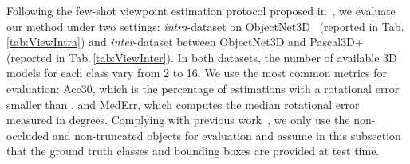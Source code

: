 \documentclass[runningheads]{llncs}
\begin{document}
Following the few-shot viewpoint estimation protocol proposed in~\cite{Tseng2019FewShotVE}, we evaluate our method under two settings: \emph{intra}-dataset on ObjectNet3D~\cite{objectnet3d16} (reported in Tab.\,\ref{tab:ViewIntra}) and \emph{inter}-dataset between ObjectNet3D and Pascal3D+~\cite{pascal3d14} (reported in Tab.\,\ref{tab:ViewInter}). 
In both datasets, the number of available 3D models for each class vary from 2 to 16.
We use the most common metrics for evaluation: Acc30, which is the percentage of estimations with a rotational error smaller than , and MedErr, which computes the median rotational error measured in degrees. 
Complying with previous work~\cite{starmap2018,Tseng2019FewShotVE}, we only use the non-occluded and non-truncated objects for evaluation and assume in this subsection that the ground truth classes and bounding boxes are provided at test time.
\end{document}
